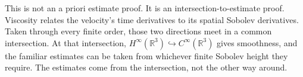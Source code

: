 \documentclass[11pt]{article}
\begin{document}
This is not an a priori estimate proof. It is an intersection-to-estimate proof. Viscosity relates the velocity's time derivatives to its spatial Sobolev derivatives. Taken through every finite order, those two directions meet in a common intersection. At that intersection, \(H^\infty(\mathbb R^3)\hookrightarrow C^\infty(\mathbb R^3)\) gives smoothness, and the familiar estimates can be taken from whichever finite Sobolev height they require. The estimates come from the intersection, not the other way around.
\end{document}
